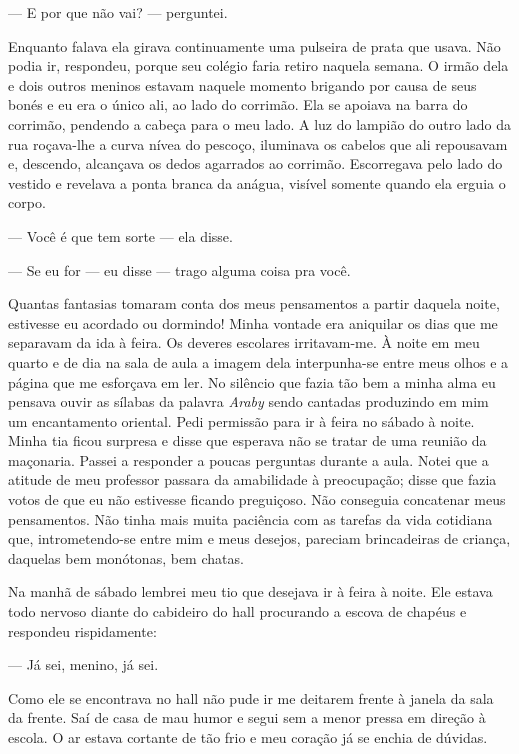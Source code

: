 --- E por que não vai? --- perguntei.

Enquanto falava ela girava continuamente uma pulseira de prata que
usava. Não podia ir, respondeu, porque seu colégio faria retiro
naquela semana. O irmão dela e dois outros meninos estavam naquele
momento brigando por causa de seus bonés e eu era o único ali, ao lado
do corrimão. Ela se apoiava na barra do corrimão, pendendo a cabeça
para o meu lado. A luz do lampião do outro lado da rua roçava-lhe a
curva nívea do pescoço, iluminava os cabelos que ali repousavam e,
descendo, alcançava os dedos agarrados ao corrimão. Escorregava pelo
lado do vestido e revelava a ponta branca da anágua, visível somente
quando ela erguia o corpo.

--- Você é que tem sorte --- ela disse.

--- Se eu for --- eu disse --- trago alguma coisa pra você.

Quantas fantasias tomaram conta dos meus pensamentos a partir daquela
noite, estivesse eu acordado ou dormindo! Minha vontade era aniquilar
os dias que me separavam da ida à feira. Os deveres escolares
irritavam-me. À noite em meu quarto e de dia na sala de aula a imagem
dela interpunha-se entre meus olhos e a página que me esforçava em
ler. No silêncio que fazia tão bem a minha alma eu pensava ouvir as
sílabas da palavra \textit{Araby} sendo cantadas produzindo em mim um
encantamento oriental. Pedi permissão para ir à feira no sábado à
noite. Minha tia ficou surpresa e disse que esperava não se tratar de
uma reunião da maçonaria. Passei a responder a poucas perguntas
durante a aula. Notei que a atitude de meu professor passara da
amabilidade à preocupação; disse que fazia votos de que eu não
estivesse ficando preguiçoso. Não conseguia concatenar meus
pensamentos. Não tinha mais muita paciência com as tarefas da vida
cotidiana que, intrometendo-se entre mim e meus desejos, pareciam
brincadeiras de criança, daquelas bem monótonas, bem chatas.

Na manhã de sábado lembrei meu tio que desejava ir à feira à noite.
Ele estava todo nervoso diante do cabideiro do hall procurando a
escova de chapéus e respondeu rispidamente:

--- Já sei, menino, já sei.

Como ele se encontrava no hall não pude ir me deitarem frente à janela
da sala da frente. Saí de casa de mau humor e segui sem
a menor pressa em direção à escola. O ar estava cortante de tão frio e
meu coração já se enchia de dúvidas.

